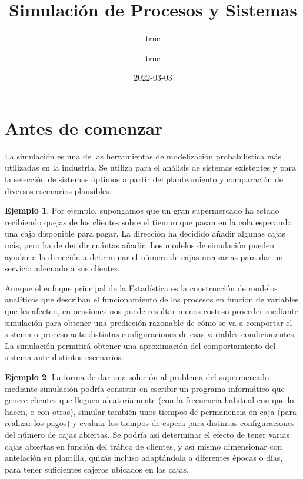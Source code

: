 \documentclass[
]{book}
\title{Simulación de Procesos y Sistemas}
\author{true \and true}
\date{2022-03-03}
\newenvironment{whitebox}{
  \definecolor{shadecolor}{rgb}{255, 255, 255}  
  \color{black}
  \begin{shaded}}
 {\end{shaded}}
\theoremstyle{definition}
\theoremstyle{definition}
\newtheorem{example}{Ejemplo}[chapter]
\theoremstyle{definition}
\theoremstyle{definition}
\theoremstyle{remark}
\begin{document}
\maketitle

{
\setcounter{tocdepth}{1}
\tableofcontents
}
\hypertarget{antes-de-comenzar}{%
\chapter*{Antes de comenzar}\label{antes-de-comenzar}}

La simulación es una de las herramientas de modelización probabilística más utilizadas en la industria. Se utiliza para el análisis de sistemas existentes y para la selección de sistemas óptimos a partir del planteamiento y comparación de diversos escenarios plausibles.

\begin{whitebox}

\begin{example}
Por ejemplo, supongamos que un gran supermercado ha estado recibiendo quejas de los clientes sobre el tiempo que pasan en la cola esperando una caja disponible para pagar. La dirección ha decidido añadir algunas cajas más, pero ha de decidir cuántas añadir. Los modelos de simulación pueden ayudar a la dirección a determinar el número de cajas necesarias para dar un servicio adecuado a sus clientes.
\end{example}

\end{whitebox}

Aunque el enfoque principal de la Estadística es la construcción de modelos analíticos que describan el funcionamiento de los procesos en función de variables que les afecten, en ocasiones nos puede resultar menos costoso proceder mediante simulación para obtener una predicción razonable de cómo se va a comportar el sistema o proceso ante distintas configuraciones de esas variables condicionantes. La simulación permitirá obtener una aproximación del comportamiento del sistema ante distintos escenarios.

\begin{whitebox}

\begin{example}
La forma de dar una solución al problema del supermercado mediante simulación podría consistir en escribir un programa informático que genere clientes que lleguen aleatoriamente (con la frecuencia habitual con que lo hacen, o con otras), simular también unos tiempos de permanencia en caja (para realizar los pagos) y evaluar los tiempos de espera para distintas configuraciones del número de cajas abiertas. Se podría así determinar el efecto de tener varias cajas abiertas en función del tráfico de clientes, y así mismo dimensionar con antelación su plantilla, quizás incluso adaptándola a diferentes épocas o días, para tener suficientes cajeros ubicados en las cajas.
\end{example}

\end{whitebox}
\end{document}
